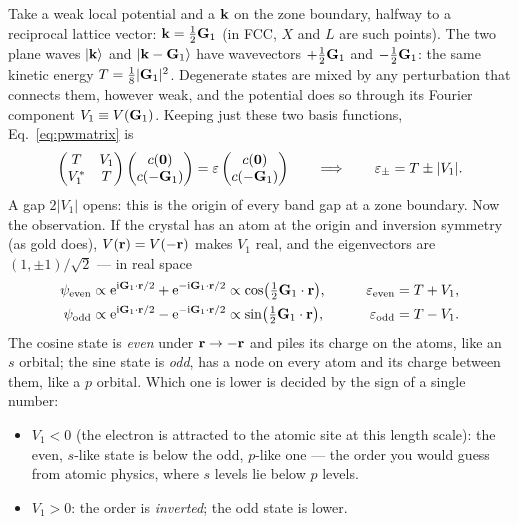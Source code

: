 Take a weak local potential and a $\mathbf{k}$ on the zone boundary, halfway to a
reciprocal lattice vector: $\mathbf{k} = \tfrac12\mathbf{G}_1$ (in FCC, $X$ and $L$ are
such points). The two plane waves $\ket{\mathbf{k}}$ and $\ket{\mathbf{k} - \mathbf{G}_1}$ have
wavevectors $+\tfrac12\mathbf{G}_1$ and $-\tfrac12\mathbf{G}_1$: the same kinetic energy
$T = \tfrac18|\mathbf{G}_1|^2$. Degenerate states are mixed by any perturbation
that connects them, however weak, and the potential does so through its
Fourier component $V_1 \equiv V(\mathbf{G}_1)$. Keeping just these two basis
functions, Eq.~\eqref{eq:pwmatrix} is
\begin{equation}
\begin{pmatrix} T & V_1 \\ V_1^* & T \end{pmatrix}
\begin{pmatrix} c(\mathbf 0) \\ c(-\mathbf{G}_1)\end{pmatrix}
= \varepsilon \begin{pmatrix} c(\mathbf 0) \\ c(-\mathbf{G}_1)\end{pmatrix}
\qquad\Longrightarrow\qquad
\varepsilon_\pm = T \pm |V_1| .
\end{equation}
A gap $2|V_1|$ opens: this is the origin of every band gap at a zone
boundary. Now the observation. If the crystal has an atom at the origin and
inversion symmetry (as gold does), $V(\mathbf{r}) = V(-\mathbf{r})$ makes $V_1$ real, and
the eigenvectors are $(1, \pm1)/\sqrt2$ --- in real space
\begin{equation}
\begin{aligned}
\psi_{\mathrm{even}} &\propto \mathrm{e}^{\mathrm{i}\mathbf{G}_1\cdot\mathbf{r}/2} + \mathrm{e}^{-\mathrm{i}\mathbf{G}_1\cdot\mathbf{r}/2}
\propto \cos\!\big(\tfrac12\mathbf{G}_1\cdot\mathbf{r}\big),
&\qquad \varepsilon_{\mathrm{even}} &= T + V_1,\\
\psi_{\mathrm{odd}} &\propto \mathrm{e}^{\mathrm{i}\mathbf{G}_1\cdot\mathbf{r}/2} - \mathrm{e}^{-\mathrm{i}\mathbf{G}_1\cdot\mathbf{r}/2}
\propto \sin\!\big(\tfrac12\mathbf{G}_1\cdot\mathbf{r}\big),
&\qquad \varepsilon_{\mathrm{odd}} &= T - V_1 .
\end{aligned}
\label{eq:nfeparity}
\end{equation}
The cosine state is \emph{even} under $\mathbf{r} \to -\mathbf{r}$ and piles its charge
on the atoms, like an $s$ orbital; the sine state is \emph{odd}, has a node
on every atom and its charge between them, like a $p$ orbital. Which one
is lower is decided by the sign of a single number:
\begin{itemize}[leftmargin=2em]
\item $V_1 < 0$ (the electron is attracted to the atomic site at this length
scale): the even, $s$-like state is below the odd, $p$-like one --- the
order you would guess from atomic physics, where $s$ levels lie below $p$
levels.
\item $V_1 > 0$: the order is \emph{inverted}; the odd state is lower.
\end{itemize}
